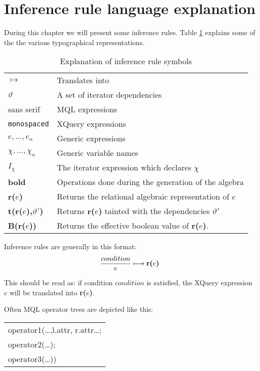\section{Inference rule language explanation}
\label{sect:trans:TD:langExpl}
During this chapter we will present some inference rules. Table \ref{tab:trans:td:langExpl} explains some of the
the various typographical representations.

\begin{table}[h]
\centering
\begin{tabular}{l|l}

  $\longmapsto$  			& Translates into \\
  $\vartheta$ 				& A set of iterator dependencies \\
  \textsf{sans serif} 		& MQL expressions \\
  \texttt{monospaced} 		& XQuery expressions \\
  $e,\ldots,e_{n}$			& Generic expressions \\
  $\chi,\ldots,\chi_{n}$	& Generic variable names \\
  $I_{\chi}$				& The iterator expression which declares $\chi$ \\
  \textbf{bold} 			& Operations done during the generation of the algebra \\
  \textbf{r(}$e$\textbf{)} 	& Returns the relational algebraic representation of $e$   \\
  \textbf{t(}\textbf{r(}$e$\textbf{)}\textbf{,}$\vartheta'$\textbf{)} & Returns \textbf{r(}$e$\textbf{)} tainted
  with the dependencies $\vartheta'$ \\
  \textbf{B(r(}$e$\textbf{))} & Returns the effective boolean value of \textbf{r(}$e$\textbf{)}.
  
\end{tabular}
\caption{Explanation of inference rule symbols}
\label{tab:trans:td:langExpl}
\end{table}

Inference rules are generally in this format:
\begin{equation*}
\frac{condition}{e}\longmapsto \mbox{\textbf{r(}}e\mbox{\textbf{)}}
\end{equation*}

This should be read as: if condition $condition$ is satisfied, the XQuery expression $e$ will be translated into
\textbf{r(}$e$\textbf{)}.

Often MQL operator trees are depicted like this:
\begin{center}
\begin{tabular}{l}
\textsf{operator1(\ldots,l.attr, r.attr\ldots; } \\ \quad
\textsf{operator2(\ldots);} \\ \quad
\textsf{operator3(\ldots))}
\end{tabular}
\end{center}

